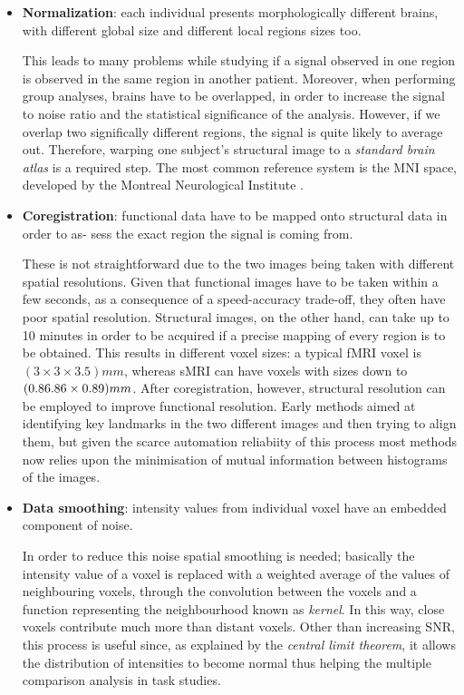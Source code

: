 \documentclass[12pt,openright,twoside,a4paper]{book}
\begin{document}
\begin{itemize}
\item \textbf{Normalization}: each individual presents morphologically different brains, with different global size and different local regions sizes  too. 

This leads to many problems while studying if a signal observed in one region is observed in the same region in another patient. 
Moreover, when performing group analyses, brains have to be overlapped, in order to increase the signal to noise ratio and the statistical significance of the analysis. 
However, if we overlap two significally different regions, the signal is quite likely to average out. 
Therefore, warping one subject’s structural image to a \textit{standard brain atlas} is a required step.
The most common reference system is the MNI space, developed by the Montreal Neurological Institute \cite{atlas}.

\item \textbf{Coregistration}: functional data have to be mapped onto structural data in order to as- sess the exact region the signal is coming from. 

These is not straightforward due to the two images being taken with different spatial resolutions. Given that functional images have to be taken within a few seconds, as a consequence of a speed-accuracy trade-off, they often have poor spatial resolution. 
Structural images, on the other hand, can take up to 10 minutes in order to be acquired if a precise mapping of every region is to be obtained.
This results in different voxel sizes: a typical fMRI voxel is $(3\times 3\times 3.5) mm$, whereas sMRI can have voxels with sizes down to $(0.86\time 0.86\times 0.89) mm$. 
After coregistration, however, structural resolution can be employed to improve functional resolution. 
Early methods aimed at identifying key landmarks in the two different images and then trying to align them, but given the scarce automation reliabiity of this process most methods now relies upon the minimisation of mutual information between histograms of the images.

\item \textbf{Data smoothing}: intensity values from individual voxel have an embedded component of noise. 

In order to reduce this noise spatial smoothing is needed; basically the intensity value of a voxel is replaced with a weighted average of the values of neighbouring voxels, through the convolution between the voxels and a function representing the neighbourhood known as \textit{kernel}. 
In this way, close voxels contribute much more than distant voxels. 
Other than increasing SNR, this process is useful since, as explained by the \textit{central limit theorem}, it allows the distribution of intensities to become normal thus helping the multiple comparison analysis in task studies.


\end{itemize}
\end{document}
